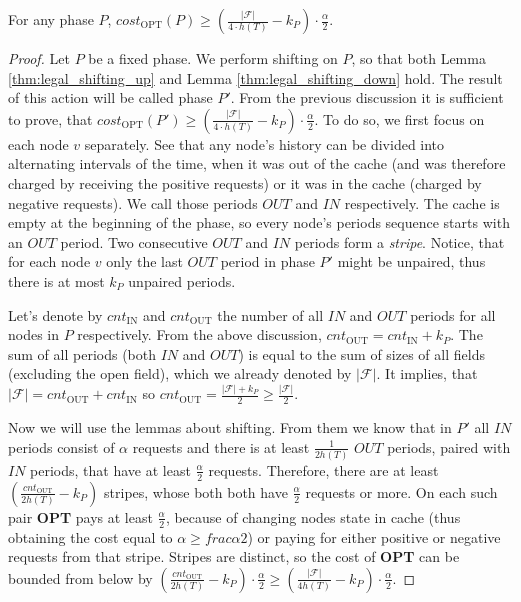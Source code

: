 \begin{lemma}
For any phase $P$, $cost_{\mathrm{OPT}}(P) \geq
(\frac{|\mathcal{F}|}{4 \cdot h(T)} -k_P) \cdot \frac{\alpha}{2}$.
\label{thm:opt_bound_with_F} \end{lemma} \begin{proof} Let $P$ be a fixed phase.
We perform shifting on $P$, so that both Lemma \ref{thm:legal_shifting_up} and
Lemma \ref{thm:legal_shifting_down} hold. The result of this action will be
called phase $P'$. From the previous discussion it is sufficient to prove, that
$cost_{\mathrm{OPT}}(P') \geq (\frac{|\mathcal{F}|}{4 \cdot h(T)}-k_P) \cdot
\frac{\alpha}{2}$. To do so, we first focus on each node $v$ separately. See
that any node's history can be divided into alternating intervals of the time,
when it was out of the cache (and was therefore charged by receiving the
positive requests) or it was in the cache (charged by negative requests). We
call those periods $OUT$ and $IN$ respectively. The cache is empty at the
beginning of the phase, so every node's periods sequence starts with an $OUT$
period. Two consecutive $OUT$ and $IN$ periods form a \textit{stripe}. Notice,
that for each node $v$ only the last $OUT$ period in phase $P'$ might be
unpaired, thus there is at most $k_P$ unpaired periods.

Let's denote by $cnt_{\mathrm{IN}}$ and $cnt_{\mathrm{OUT}}$ the number of all
$IN$ and $OUT$ periods for all nodes in $P$  respectively. From the above
discussion, $cnt_{\mathrm{OUT}} = cnt_{\mathrm{IN}} + k_P$. The sum of all
periods (both $IN$ and $OUT$) is equal to the sum of sizes of all fields
(excluding the open field), which we already denoted by $|\mathcal{F}|$. It
implies, that $|\mathcal{F}| = cnt_{\mathrm{OUT}} + cnt_{\mathrm{IN}}$ so
$cnt_{\mathrm{OUT}} = \frac{|\mathcal{F}| + k_P}{2} \geq
\frac{|\mathcal{F}|}{2}.$

Now we will use the lemmas about shifting. From them we know that in $P'$ all
$IN$ periods consist of $\alpha$ requests and there is at least
$\frac{1}{2h(T)}$ $OUT$ periods, paired with $IN$ periods, that have at least
$\frac{\alpha}{2}$ requests. Therefore, there are at least
$(\frac{cnt_{\mathrm{OUT}}}{2h(T)} - k_P)$ stripes, whose both both have
$\frac{\alpha}{2}$ requests or more. On each such pair \textbf{OPT} pays at
least $\frac{\alpha}{2}$, because of changing nodes state in cache (thus
obtaining the cost equal to $\alpha \geq frac{\alpha}{2}$) or paying for either
positive or negative requests from that stripe.  Stripes are distinct, so the
cost of \textbf{OPT} can be bounded from below by
$(\frac{cnt_{\mathrm{OUT}}}{2h(T)} - k_P) \cdot \frac{\alpha}{2} \geq
(\frac{|\mathcal{F}|}{4h(T)} - k_P) \cdot  \frac{\alpha}{2}$.  \end{proof}

